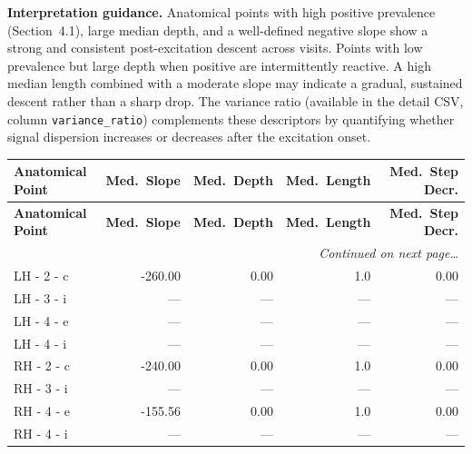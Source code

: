 \documentclass[a4paper,11pt]{article}
\begin{document}
\medskip
\noindent\textbf{Interpretation guidance.}
Anatomical points with high positive prevalence (Section~4.1), large median depth, and a
well-defined negative slope show a strong and consistent post-excitation descent across
visits.
Points with low prevalence but large depth when positive are intermittently reactive.
A high median length combined with a moderate slope may indicate a gradual, sustained
descent rather than a sharp drop.
The variance ratio (available in the detail CSV, column \texttt{variance\_ratio}) complements
these descriptors by quantifying whether signal dispersion increases or decreases after the
excitation onset.

\begin{small}
\begin{longtable}{p{4.5cm}rrrr}
\toprule
\textbf{Anatomical Point} &
\textbf{Med.\ Slope} &
\textbf{Med.\ Depth} &
\textbf{Med.\ Length} &
\textbf{Med.\ Step Decr.} \\
\midrule
\endfirsthead
\toprule
\textbf{Anatomical Point} &
\textbf{Med.\ Slope} &
\textbf{Med.\ Depth} &
\textbf{Med.\ Length} &
\textbf{Med.\ Step Decr.} \\
\midrule
\endhead
\midrule
\multicolumn{5}{r}{\small\emph{Continued on next page\ldots}} \\
\endfoot
\bottomrule
\endlastfoot
LH - 2 - c & -260.00 & 0.00 & 1.0 & 0.00 \\
LH - 3 - i & --- & --- & --- & --- \\
LH - 4 - e & --- & --- & --- & --- \\
LH - 4 - i & --- & --- & --- & --- \\
RH - 2 - c & -240.00 & 0.00 & 1.0 & 0.00 \\
RH - 3 - i & --- & --- & --- & --- \\
RH - 4 - e & -155.56 & 0.00 & 1.0 & 0.00 \\
RH - 4 - i & --- & --- & --- & --- \\
\end{longtable}
\end{small}
\end{document}
